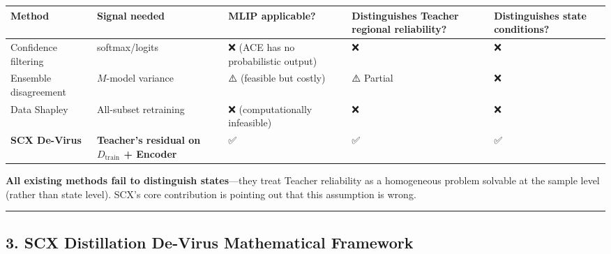 \documentclass[
  12pt,
]{article}
\begin{document}
\begin{longtable}[]{@{}
  >{\raggedright\arraybackslash}p{}
  >{\raggedright\arraybackslash}p{}
  >{\centering\arraybackslash}p{}
  >{\centering\arraybackslash}p{}
  >{\centering\arraybackslash}p{}@{}}
\toprule\noalign{}
\begin{minipage}[b]{\linewidth}\raggedright
Method
\end{minipage} & \begin{minipage}[b]{\linewidth}\raggedright
Signal needed
\end{minipage} & \begin{minipage}[b]{\linewidth}\centering
MLIP applicable?
\end{minipage} & \begin{minipage}[b]{\linewidth}\centering
Distinguishes Teacher regional reliability?
\end{minipage} & \begin{minipage}[b]{\linewidth}\centering
Distinguishes state conditions?
\end{minipage} \\
\midrule\noalign{}
\endhead
\bottomrule\noalign{}
\endlastfoot
Confidence filtering & softmax/logits & ❌ (ACE has no probabilistic output) & ❌ & ❌ \\
Ensemble disagreement & $M$-model variance & ⚠️ (feasible but costly) & ⚠️ Partial & ❌ \\
Data Shapley & All-subset retraining & ❌ (computationally infeasible) & ❌ & ❌ \\
\textbf{SCX De-Virus} & \textbf{Teacher's residual on $D_{\text{train}}$ + Encoder} & ✅ & ✅ & ✅ \\
\end{longtable}

\textbf{All existing methods fail to distinguish states}---they treat Teacher reliability as a homogeneous problem solvable at the sample level (rather than state level). SCX's core contribution is pointing out that this assumption is wrong.

\begin{center}\rule{0.5\linewidth}{0.5pt}\end{center}

\subsection{3. SCX Distillation De-Virus Mathematical Framework}\label{scx-distillation-de-virus-mathematical-framework}
\end{document}
